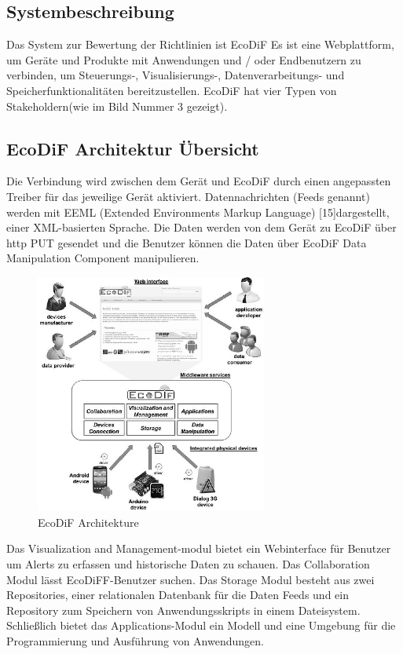 \documentclass{acmsiggraph}
\begin{document}
\subsection{Systembeschreibung}
Das System zur Bewertung der Richtlinien ist EcoDiF
Es ist eine Webplattform, um Geräte und Produkte mit Anwendungen und / oder Endbenutzern zu verbinden, um Steuerungs-, Visualisierungs-, Datenverarbeitungs- und Speicherfunktionalitäten bereitzustellen. EcoDiF hat vier Typen von Stakeholdern(wie im Bild Nummer 3 gezeigt).
\subsection{EcoDiF Architektur Übersicht}
Die Verbindung wird zwischen dem Gerät und EcoDiF durch einen angepassten Treiber für das jeweilige Gerät aktiviert.
Datennachrichten (Feeds genannt) werden mit EEML (Extended Environments Markup Language) [15]dargestellt, einer XML-basierten Sprache. 
Die Daten werden von dem Gerät zu EcoDiF über http PUT gesendet und die Benutzer können die Daten über EcoDiF Data Manipulation Component manipulieren.
\begin{figure}[ht]
  \centering
  \includegraphics[width=3.0in]{images/eco_dif_archi}
  \caption{EcoDiF Architekture}
  \label{fig:ecoDiF_Architecture}
\end{figure}
Das Visualization and Management-modul bietet ein Webinterface für Benutzer um Alerts zu erfassen und historische Daten zu schauen.
Das Collaboration Modul lässt EcoDiFF-Benutzer suchen. Das Storage Modul besteht aus zwei Repositories, einer relationalen Datenbank für die Daten Feeds und ein Repository zum Speichern von Anwendungsskripts in einem Dateisystem.
Schließlich bietet das Applications-Modul ein Modell und eine Umgebung für die Programmierung und Ausführung von Anwendungen.
\end{document}
